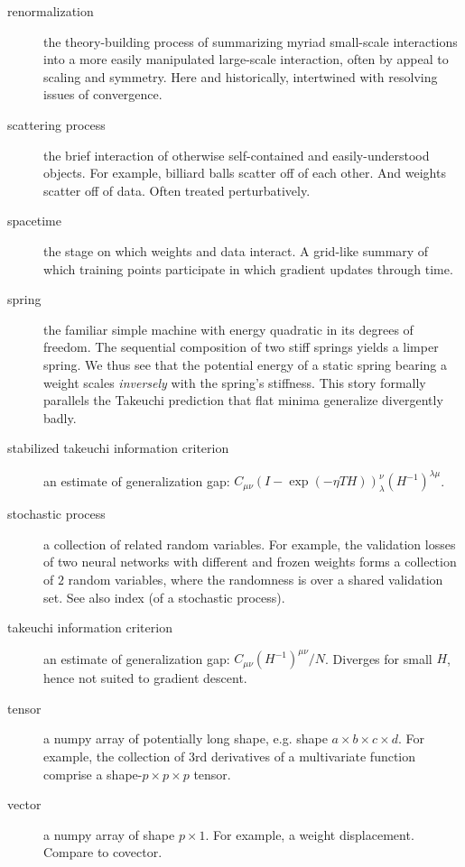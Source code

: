 \documentclass{article}
\theoremstyle{plain}
\theoremstyle{definition}
\newcommand{\wrap}[1]{\left(#1\right)}
\begin{document}
\begin{description}
        \item[renormalization] the theory-building process of summarizing myriad small-scale interactions into a more easily manipulated large-scale interaction, often by appeal to scaling and symmetry.  Here and historically, intertwined with resolving issues of convergence.  
        \item[scattering process] the brief interaction of otherwise self-contained and easily-understood objects.  For example, billiard balls scatter off of each other.  And weights scatter off of data.  Often treated perturbatively. 
        \item[spacetime] the stage on which weights and data interact.  A grid-like summary of which training points participate in which gradient updates through time. 
        \item[spring] the familiar simple machine with energy quadratic in its degrees of freedom.  The sequential composition of two stiff springs yields a limper spring.  We thus see that the potential energy of a static spring bearing a weight scales \emph{inversely} with the spring's stiffness.  This story formally parallels the Takeuchi prediction that flat minima generalize divergently badly.
        \item[stabilized takeuchi information criterion] an estimate of generalization gap: $C_{\mu\nu}\wrap{ I - \exp(-\eta T H) }^{\nu}_{\lambda}\wrap{H^{-1}}^{\lambda\mu}$. 
        \item[stochastic process] a collection of related random variables.  For example, the validation losses of two neural networks with different and frozen weights forms a collection of $2$ random variables, where the randomness is over a shared validation set.  See also index (of a stochastic process).
        \item[takeuchi information criterion] an estimate of generalization gap: $C_{\mu\nu}(H^{-1})^{\mu\nu}/N$.  Diverges for small $H$, hence not suited to gradient descent.
        \item[tensor] a numpy array of potentially long shape, e.g. shape $a\times b\times c\times d$.  For example, the collection of $3$rd derivatives of a multivariate function comprise a shape-$p\times p\times p$ tensor. 
        \item[vector] a numpy array of shape $p\times 1$.  For example, a weight displacement.  Compare to covector.
    \end{description}

    \clearpage
    \newpage
\end{document}
